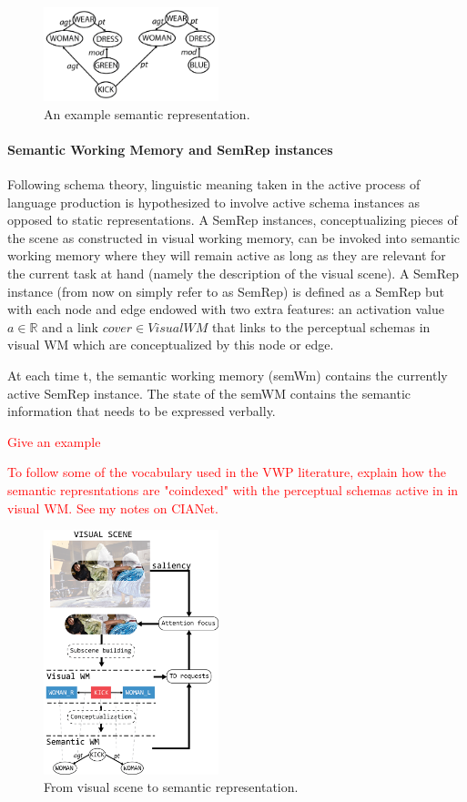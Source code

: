 \documentclass{article}
\newcommand\todo[1]{\textcolor{red}{#1}}
\begin{document}
\begin{figure}[H]
	\centering
	\includegraphics[width=2.0in]{Figures/SemRep_ex.png}
	\caption{An example semantic representation.}
	\label{fig:semrep_ex}
\end{figure}

\paragraph{Semantic Working Memory and SemRep instances}
Following schema theory, linguistic meaning taken in the active process of language production is hypothesized to involve active schema instances as opposed to static representations. A SemRep instances, conceptualizing pieces of the scene as constructed in visual working memory, can be invoked into semantic working memory where they will remain active as long as they are relevant for the current task at hand (namely the description of the visual scene). 
A SemRep instance (from now on simply refer to as SemRep) is 
defined as a SemRep but with each node and edge endowed with two extra features: an activation value $a \in \mathbb{R}$ and a link $cover \in VisualWM $ that links to the perceptual schemas in visual WM which are conceptualized by this node or edge.

At each time t, the semantic working memory (semWm) contains the currently active SemRep instance. The state of the semWM contains the semantic information that needs to be expressed verbally.

\todo{Give an example}

\todo{To follow some of the vocabulary used in the VWP literature, explain how the semantic represntations are "coindexed" with the perceptual schemas active in in visual WM. See my notes on CIANet.}

\begin{figure}[H]
	\centering
	\includegraphics[width=2.0in]{Figures/SemRepInstance.png}
	\caption{From visual scene to semantic representation.}
	\label{fig:semrep_inst}
\end{figure}
\end{document}
